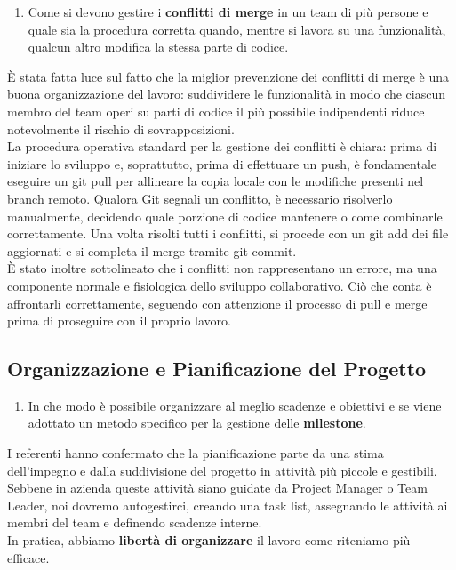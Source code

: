     \begin{enumerate}[resume*, itemsep=0pt, parsep=1pt, leftmargin=*, label=\arabic*.]
        \item Come si devono gestire i \textbf{conflitti di merge} in un team di più persone e quale sia la procedura corretta quando, mentre si lavora su una funzionalità, qualcun altro modifica la stessa parte di codice.
    \end{enumerate} \vspace{-0.5em}
    È stata fatta luce sul fatto che la miglior prevenzione dei conflitti di merge è una buona organizzazione del lavoro: suddividere le funzionalità in modo che ciascun membro del team operi su parti di codice il più possibile indipendenti riduce notevolmente il rischio di sovrapposizioni.\\
    La procedura operativa standard per la gestione dei conflitti è chiara: prima di iniziare lo sviluppo e, soprattutto, prima di effettuare un push, è fondamentale eseguire un git pull per allineare la copia locale con le modifiche presenti nel branch remoto. Qualora Git segnali un conflitto, è necessario risolverlo manualmente, decidendo quale porzione di codice mantenere o come combinarle correttamente. Una volta risolti tutti i conflitti, si procede con un git add dei file aggiornati e si completa il merge tramite git commit.\\
    È stato inoltre sottolineato che i conflitti non rappresentano un errore, ma una componente normale e fisiologica dello sviluppo collaborativo. Ciò che conta è affrontarli correttamente, seguendo con attenzione il processo di pull e merge prima di proseguire con il proprio lavoro.

\subsection{Organizzazione e Pianificazione del Progetto}
    \begin{enumerate}[resume*, itemsep=0pt, parsep=1pt, leftmargin=*, label=\arabic*.]
        \item In che modo è possibile organizzare al meglio scadenze e obiettivi e se viene adottato un metodo specifico per la gestione delle \textbf{milestone}.
    \end{enumerate} \vspace{-0.5em}
    I referenti hanno confermato che la pianificazione parte da una stima dell'impegno e dalla suddivisione del progetto in attività più piccole e gestibili. Sebbene in azienda queste attività siano guidate da Project Manager o Team Leader, noi dovremo autogestirci, creando una task list, assegnando le attività ai membri del team e definendo scadenze interne.\\
    In pratica, abbiamo \textbf{libertà di organizzare} il lavoro come riteniamo più efficace.


